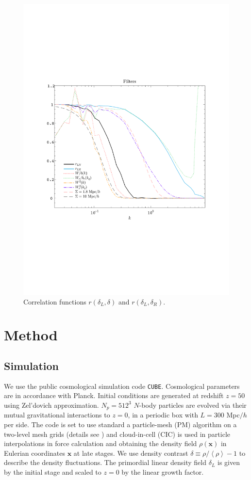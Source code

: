 \documentclass[aps,prd,twocolumn,superscriptaddress,amsfont,amssymb,amsmath,nofootinbib,showpacs,balancelastpage]{revtex4-1}
\newcommand{\bs}{\boldsymbol}
\newcommand{\lb}{\left\langle}
\newcommand{\rb}{\right\rangle}
\begin{document}
\begin{figure}[t] \centering
  \includegraphics[width=1.0\linewidth]{fig2.pdf}
  \caption{Correlation functions $r(\delta_L,\delta)$ and $r(\delta_L,\delta_R)$.}
  \label{fig.2}
\end{figure}

\section{Method}\label{sec.method}

\subsection{Simulation}
We use the public cosmological simulation code {\tt CUBE}. Cosmological parameters 
are in accordance with Planck. Initial conditions are generated at redshift $z=50$ 
using Zel'dovich approximation. $N_p=512^3$ $N$-body particles are evolved via 
their mutual gravitational interactions to $z=0$, in a periodic box with $L=300$ 
Mpc$/h$ per side. The code is set to use standard a particle-mesh (PM) algorithm 
\cite{1988csup.book.....H} on a two-level mesh grids (details see \cite{2013MNRAS.
436..540H}) and cloud-in-cell (CIC) is used in particle interpolations in force 
calculation and obtaining the density field $\rho({\bs x})$ in Eulerian coordinates 
${\bs x}$ at late stages. We use density contrast $\delta\equiv\rho/\lb\rho\rb-1$ 
to describe the density fluctuations. The primordial linear density field $
\delta_L$ is given by the initial stage and scaled to $z=0$ by the linear growth 
factor.
\end{document}
